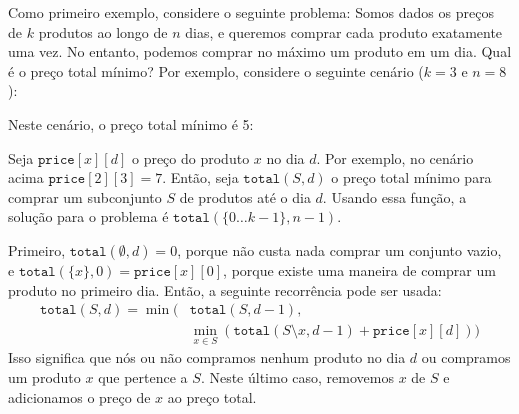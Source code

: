 Como primeiro exemplo, considere o seguinte problema:
Somos dados os preços de $k$ produtos
ao longo de $n$ dias, e queremos comprar cada produto
exatamente uma vez.
No entanto, podemos comprar no máximo um produto
em um dia.
Qual é o preço total mínimo?
Por exemplo, considere o seguinte cenário ($k=3$ e $n=8$):
\begin{center}
\end{center}
Neste cenário, o preço total mínimo é 5:
\begin{center}
\end{center}

Seja $\texttt{price}[x][d]$ o preço do produto $x$
no dia $d$.
Por exemplo, no cenário acima $\texttt{price}[2][3] = 7$.
Então, seja $\texttt{total}(S,d)$ o preço total mínimo
para comprar um subconjunto $S$ de produtos até o dia $d$.
Usando essa função, a solução para o problema é
$\texttt{total}(\{0 \ldots k-1\},n-1)$.

Primeiro, $\texttt{total}(\emptyset,d) = 0$,
porque não custa nada comprar um conjunto vazio,
e $\texttt{total}(\{x\},0) = \texttt{price}[x][0]$,
porque existe uma maneira de comprar um produto no primeiro dia.
Então, a seguinte recorrência pode ser usada:
\begin{equation*}
\begin{split}
\texttt{total}(S,d) = \min( & \texttt{total}(S,d-1), \\
& \min_{x \in S} (\texttt{total}(S \setminus x,d-1)+\texttt{price}[x][d]))
\end{split}
\end{equation*}
Isso significa que nós ou não compramos nenhum produto no dia $d$
ou compramos um produto $x$ que pertence a $S$.
Neste último caso, removemos $x$ de $S$ e adicionamos o
preço de $x$ ao preço total.

